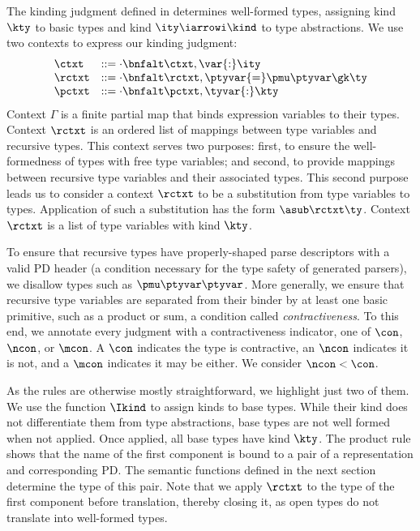 The kinding judgment defined in  determines
well-formed \ddc{} types, assigning kind $\kty$ to basic types and
kind $\ity \iarrowi \kind$ to type abstractions.  We use two contexts to express our kinding judgment:
\[
\begin{array}{ll}
\ctxt  & \mathrel{::=} \cdot \bnfalt \ctxt,{\var{:}\ity}\\
\rctxt & \mathrel{::=} \cdot \bnfalt \rctxt,\ptyvar{=}\pmu \ptyvar \gk \ty\\
\pctxt  & \mathrel{::=} \cdot \bnfalt \pctxt,\tyvar{:}\kty
\end{array}
\]
Context $\Gamma$ is a finite partial map that binds expression
variables to their types.
Context $\rctxt$ is an ordered list of mappings between type variables and recursive types.
This context serves two purposes: first, to ensure the well-formedness
of types with free type variables; and second, to provide mappings
between recursive type variables and their associated types. 
This second purpose leads us to consider a context $\rctxt$ to be a
substitution from type variables to types. Application of such a
substitution has the form $\asub \rctxt \ty$.
Context $\rctxt$ is a list of type variables with kind $\kty$.

To ensure that recursive types have properly-shaped parse descriptors
with a valid PD header (a condition necessary for the type safety of
generated parsers), we disallow types such as $\pmu \ptyvar
\ptyvar$. More generally, we ensure that
recursive type variables are separated from their binder by at least
one basic primitive, such as a product or sum, a condition called {\it contractiveness}. To this end, we annotate every judgment with a contractiveness
indicator, one of $\con$, $\ncon$, or $\mcon$. A
$\con$ indicates the type is contractive, an $\ncon$
indicates it is not, and a $\mcon$ indicates it may be either. 
We consider $\ncon < \con$. 

As the rules are otherwise mostly straightforward, we highlight
just two of them. We use the function $\Ikind$ to assign kinds to base types.
While their kind does not differentiate them from type
abstractions, base types are not well formed when not applied.  
Once applied, all base types have kind $\kty$. The product rule
shows that the name of the first component is bound to a pair of a representation and corresponding PD.
The semantic functions defined in the next section determine the type of this pair.
Note that we apply $\rctxt$ to the type of the first component before
translation, thereby closing it,
 as open \ddc{}
types do not translate into well-formed \implang{} types.

